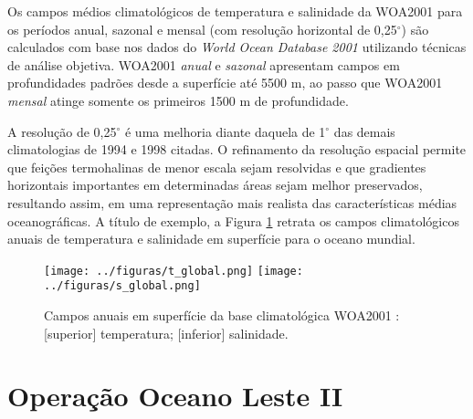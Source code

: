 Os campos médios climatológicos de temperatura e salinidade da WOA2001 para os períodos anual, 
sazonal e mensal (com resolução horizontal de 0,25$^\circ$) são calculados com base nos dados do 
\textsl{World Ocean Database 2001} utilizando técnicas de análise objetiva. WOA2001 \textit{anual} 
e \textit{sazonal} apresentam campos em profundidades padrões desde a superfície até 5500 m, 
ao passo que WOA2001 \textit{mensal} atinge somente os primeiros 1500 m de profundidade. 

A resolução de 0,25$^\circ$ é uma melhoria diante daquela de 1$^\circ$ das demais 
climatologias de 1994 e 1998 citadas. O refinamento da resolução espacial permite que feições termohalinas de menor escala 
sejam resolvidas e que gradientes horizontais importantes em determinadas áreas sejam melhor 
preservados, resultando assim, em uma representação mais realista das características médias 
oceanográficas. A título de exemplo, a Figura \ref{fig:ex_woa} retrata 
os campos climatológicos anuais de temperatura e salinidade em superfície para o oceano mundial.

\begin{figure}%
 \begin{center}
  \texttt{[image: ../figuras/t\_global.png]}
  \texttt{[image: ../figuras/s\_global.png]}
 \end{center}
 \vspace{-.25cm}
 \renewcommand{\baselinestretch}{1}
 \caption{\label{fig:ex_woa} \small Campos anuais em superfície da base climatológica WOA2001 
 \citep{boyer_etal2005}: [superior] temperatura; [inferior] salinidade.}
\end{figure}

\newpage

\section{Operação Oceano Leste II}\label{sec:oe2}

